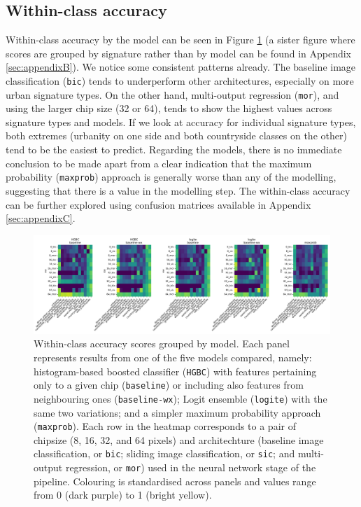 \subsection*{Within-class accuracy}
Within-class accuracy by the model can be seen in Figure \ref{fig:wc_accuracy_x_model} (a
sister figure where scores are grouped by signature rather than by model can be found in
Appendix \ref{sec:appendixB}). We notice some consistent patterns already. The
baseline image classification (\texttt{bic}) tends to underperform other architectures,
especially on more urban signature types. On the other hand, multi-output regression (\texttt{mor}), and
using the larger chip size (32 or 64), tends to show the highest values across signature
types and models. If we look at accuracy for individual signature types, both extremes
(urbanity on one side and both countryside classes on the other)
tend to be the easiest to predict. Regarding the models, there is no immediate conclusion to be
made apart from a clear indication that the maximum probability (\texttt{maxprob}) approach is generally
worse than any of the modelling, suggesting that there is a value in the modelling step.
The within-class accuracy can be further explored using confusion matrices available in
Appendix \ref*{sec:appendixC}.

\begin{figure}
    \centering
    \includegraphics[width=1.0\linewidth]{fig/wc_accuracy_x_model.png}
    \caption{\footnotesize Within-class accuracy scores grouped by model. Each panel
    represents results from one of the five models compared, namely:
    histogram-based boosted classifier (\texttt{HGBC}) with features
    pertaining only to a given chip (\texttt{baseline}) or including also features
    from neighbouring ones (\texttt{baseline-wx}); Logit ensemble
    (\texttt{logite}) with the same two variations; and a simpler maximum
    probability approach (\texttt{maxprob}). Each row in the heatmap
    corresponds to a pair of chipsize (8, 16, 32, and 64 pixels)
    and architechture (baseline image classification, or \texttt{bic}; sliding
            image classification, or \texttt{sic}; and multi-output
    regression, or \texttt{mor}) used in the neural network stage of the
    pipeline. Colouring is standardised across panels and values range from
    0 (dark purple) to 1 (bright yellow).}
    \label{fig:wc_accuracy_x_model}
\end{figure}


